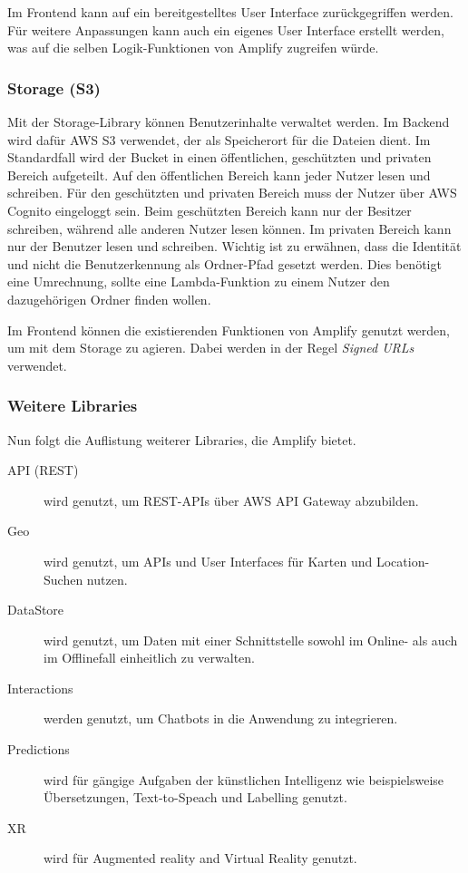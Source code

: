 Im Frontend kann auf ein bereitgestelltes User Interface zurückgegriffen werden. Für weitere Anpassungen kann auch ein eigenes User Interface erstellt werden, was auf die selben Logik-Funktionen von Amplify zugreifen würde.

\subsubsection{Storage (S3)}

Mit der Storage-Library können Benutzerinhalte verwaltet werden. Im Backend wird dafür \ac{AWS} S3 verwendet, der als Speicherort für die Dateien dient. Im Standardfall wird der Bucket in einen öffentlichen, geschützten und privaten Bereich aufgeteilt. Auf den öffentlichen Bereich kann jeder Nutzer lesen und schreiben. Für den geschützten und privaten Bereich muss der Nutzer über \ac{AWS} Cognito eingeloggt sein. Beim geschützten Bereich kann nur der Besitzer schreiben, während alle anderen Nutzer lesen können. Im privaten Bereich kann nur der Benutzer lesen und schreiben. Wichtig ist zu erwähnen, dass die Identität und nicht die Benutzerkennung als Ordner-Pfad gesetzt werden. Dies benötigt eine Umrechnung, sollte eine Lambda-Funktion zu einem Nutzer den dazugehörigen Ordner finden wollen.

Im Frontend können die existierenden Funktionen von Amplify genutzt werden, um mit dem Storage zu agieren. Dabei werden in der Regel \textit{Signed URLs} verwendet.

\subsubsection{Weitere Libraries}

Nun folgt die Auflistung weiterer Libraries, die Amplify bietet.
\begin{description}
   \item[API (\acs{REST})] wird genutzt, um \acs{REST}-APIs über AWS API Gateway abzubilden.
   \item[Geo] wird genutzt, um APIs und User Interfaces für Karten und Location-Suchen nutzen.
   \item[DataStore] wird genutzt, um Daten mit einer Schnittstelle sowohl im Online- als auch im Offlinefall einheitlich zu verwalten.
   \item[Interactions] werden genutzt, um Chatbots in die Anwendung zu integrieren.
   \item[Predictions] wird für gängige Aufgaben der künstlichen Intelligenz wie beispielsweise Übersetzungen, Text-to-Speach und Labelling genutzt.
   \item[XR] wird für Augmented reality and Virtual Reality genutzt.
\end{description}

